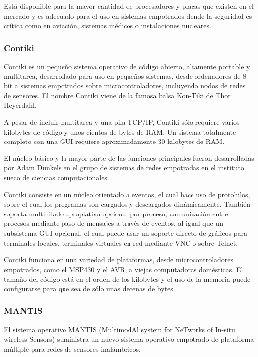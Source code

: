 Está disponible para la mayor cantidad de procesadores y placas que existen en el mercado y es adecuado para el uso en sistemas empotrados donde la seguridad es crítica como en aviación, sistemas médicos o instalaciones nucleares.



\subsubsection{Contiki}
Contiki es un pequeño sistema operativo de código abierto, altamente portable y multitarea, desarrollado para uso en pequeños sistemas, desde ordenadores de 8-bit a sistemas empotrados sobre microcontroladores, incluyendo nodos de redes de sensores. El nombre Contiki viene de la famosa balsa Kon-Tiki de Thor Heyerdahl.




A pesar de incluir multitarea y una pila TCP/IP, Contiki sólo requiere varios kilobytes de código y unos cientos de bytes de RAM. Un sistema totalmente completo con una GUI requiere aproximadamente 30 kilobytes de RAM.

El núcleo básico y la mayor parte de las funciones principales fueron desarrolladas por Adam Dunkels en el grupo de sistemas de redes empotradas en el instituto sueco de ciencias computacionales.




Contiki consiste en un núcleo orientado a eventos, el cual hace uso de protohilos, sobre el cual los programas son cargados y descargados dinámicamente. También soporta multihilado apropiativo opcional por proceso, comunicación entre procesos mediante paso de mensajes a través de eventos, al igual que un subsistema GUI opcional, el cual puede usar un soporte directo de gráficos para terminales locales, terminales virtuales en red mediante VNC o sobre Telnet.



Contiki funciona en una variedad de plataformas, desde microcontroladores empotrados, como el MSP430 y el AVR, a viejas computadoras domésticas. El tamaño del código está en el orden de los kilobytes y el uso de la memoria puede configurarse para que sea de sólo unas decenas de bytes.

\subsubsection{MANTIS}
El sistema operativo MANTIS (MultimodAl system for NeTworks of In-situ wireless Sensors) suministra un nuevo sistema operativo empotrado de plataforma múltiple para redes de sensores inalámbricos. 



